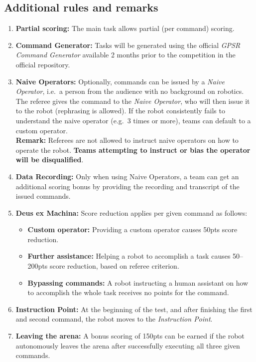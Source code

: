 %
%
\subsection*{Additional rules and remarks}
\begin{enumerate}[nosep]
	\item \textbf{Partial scoring:} The main task allows partial (per command) scoring.
	
	\item \textbf{Command Generator:} Tasks will be generated using the official \emph{GPSR Command Generator} available 2 months prior to the competition in the official repository.

	\item \textbf{Naive Operators:} Optionally, commands can be issued by a \emph{Naive Operator}, i.e.~a person from the audience with no background on robotics. The referee gives the command to the \emph{Naive Operator}, who will then issue it to the robot (rephrasing is allowed). If the robot consistently fails to understand the naive operator (e.g.~3 times or more), teams can default to a custom operator.
	\\[2mm]\textbf{Remark:} Referees are not allowed to instruct naive operators on how to operate the robot. \textbf{Teams attempting to instruct or bias the operator will be disqualified}.\\[2mm]

	\item \textbf{Data Recording:} Only when using Naive Operators, a team can get an additional scoring bonus by providing the recording and transcript of the issued commands.

	\item \textbf{Deus ex Machina:} Score reduction applies per given command as follows:
	\begin{itemize}[nosep]
	\item \textbf{Custom operator:} Providing a custom operator causes 50pts score reduction.
	\item \textbf{Further assistance:} Helping a robot to accomplish a task causes 50--200pts score reduction, based on referee criterion.
	\item \textbf{Bypassing commands:} A robot instructing a human assistant on how to accomplish the whole task receives no points for the command.
	\end{itemize}

	\item \textbf{Instruction Point:} At the beginning of the test, and after finishing the first and second command, the robot moves to the \textit{Instruction Point}.

	\item \textbf{Leaving the arena:} A bonus scoring of 150pts can be earned if the robot autonomously leaves the arena after successfully executing all three given commands.
\end{enumerate}

